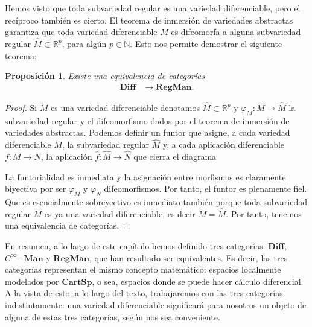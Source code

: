 \documentclass[12pt,a4paper]{book}
\newtheorem{prop}[thm]{Proposición}
\theoremstyle{definition} \newtheorem{defn}[thm]{Definición}
\theoremstyle{definition} \newtheorem{ejemplo}[thm]{Ejemplo}
\theoremstyle{definition} \newtheorem{ejercicio}[thm]{Ejercicio}
\theoremstyle{remark} \newtheorem*{obs}{Observación}
\def\RR{\mathbb{R}}
\def\NN{\mathbb{N}}
\begin{document}
    Hemos visto que toda subvariedad regular es una variedad diferenciable, pero el recíproco también es cierto. El teorema de inmersión de variedades abstractas garantiza que toda variedad diferenciable $M$ es difeomorfa a alguna subvariedad regular $\hat{M} \subset \RR^p$, para algún $p\in \NN$. Esto nos permite demostrar el siguiente teorema:

    \begin{prop}
      Existe una equivalencia de categorías
      \begin{align*}
	\mathbf{Diff}&\longrightarrow \mathbf{RegMan}.
	\end{align*}
    \end{prop}
    \begin{proof}
      Si $M$ es una variedad diferenciable denotamos $\hat{M} \subset \RR^p$ y $\varphi_M:M \rightarrow \hat{M}$ la subvariedad regular y el difeomorfismo dados por el teorema de inmersión de variedades abstractas. Podemos definir un funtor que asigne, a cada variedad diferenciable $M$, la subvariedad regular $\hat{M}$ y, a cada aplicación diferenciable $f:M \rightarrow N$, la aplicación $\hat{f}:\hat{M} \rightarrow \hat{N}$ que cierra el diagrama
      \begin{center}
       \end{center}
       La funtorialidad es inmediata y la asignación entre morfismos es claramente biyectiva por ser $\varphi_M$ y $\varphi_N$ difeomorfismos. Por tanto, el funtor es plenamente fiel. Que es esencialmente sobreyectivo es inmediato también porque toda subvariedad regular $M$ es ya una variedad diferenciable, es decir $M=\hat{M}$. Por tanto, tenemos una equivalencia de categorías.
    \end{proof}

    En resumen, a lo largo de este capítulo hemos definido tres categorías: $\mathbf{Diff}$, $C^\infty\mathbf{-Man}$ y $\mathbf{RegMan}$, que han resultado ser equivalentes. Es decir, las tres categorías representan el mismo concepto matemático: espacios localmente modelados por $\mathbf{CartSp}$, o sea, espacios donde se puede hacer cálculo diferencial. A la vista de esto, a lo largo del texto, trabajaremos con las tres categorías indistintamente: una variedad diferenciable significará para nosotros un objeto de alguna de estas tres categorías, según nos sea conveniente.
\end{document}
